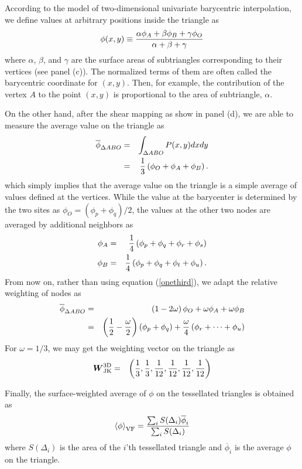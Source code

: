 \documentclass[twocolumn]{aastex63}
\begin{document}
According to the model of two-dimensional univariate barycentric interpolation, we define values at arbitrary positions inside the triangle as
 \begin{equation}
 	\phi(x,y) \equiv {\alpha\phi_A +\beta\phi_B+\gamma\phi_O \over\alpha+\beta+\gamma}
 \end{equation}
 where $\alpha$, $\beta$, and $\gamma$ are the surface areas of subtriangles corresponding to their vertices (see panel (c)). The normalized terms of them are often called the barycentric coordinate for $(x,y)$. Then, for example, the contribution of the vertex $A$ to the point $(x,y)$ is proportional to the area of subtriangle, $\alpha$.
 
 On the other hand, after the shear mapping as show in panel (d), we are able to measure the average value on the triangle as 
 \begin{eqnarray}
 	\overline{\phi}_{\Delta ABO} &=& \int_{\Delta ABO}P(x,y)dxdy \\ \label{onethird}
 	&=& {1\over3}\left( \phi_O +\phi_A + \phi_B\right).
 \end{eqnarray}
which simply implies that the average value on the triangle is a simple average of values defined at the vertices.
While the value at the barycenter is determined by the two sites as $\phi_O = (\phi_p+\phi_q)/2$, the values at the other two nodes are averaged by additional neighbors as
\begin{eqnarray}
	\phi_A &=& {1\over 4}\left(\phi_p +\phi_q + \phi_r + \phi_s \right) \\
	\phi_B &=& {1\over 4}\left(\phi_p +\phi_q + \phi_t + \phi_u \right).
\end{eqnarray}
From now on, rather than using equation (\ref{onethird}), we adapt the relative weighting of nodes as
\begin{eqnarray}
	\overline{\phi}_{\Delta ABO} &=& \left( 1 - {2\omega}\right) \phi_O + {\omega} \phi_A + {\omega} \phi_B \\ \nonumber
	&=& \left( {1\over2} - {\omega\over2}\right) \left( \phi_p + \phi_q\right) + {\omega\over 4}\left( \phi_r +\cdots +\phi_u\right)
\end{eqnarray}
For $\omega=1/3$, we may get the weighting vector on the triangle as
\begin{eqnarray}
	\boldsymbol{W}^\text{3D}_\text{JK} &=& \left({1\over3},{1\over3},{1\over 12}, {1\over 12}, {1\over 12}, {1\over 12}\right)
\end{eqnarray}

Finally, the surface-weighted average of $\phi$ on the tessellated triangles is obtained as
\begin{equation*}
	\left<\phi\right>_\text{VF} = { \sum_i S(\Delta_i)\overline{\phi}_i \over \sum_i S(\Delta_i)}
\end{equation*}
where $S(\Delta_i)$ is the area of the $i$'th tessellated triangle and $\overline{\phi}_i$ is the average $\phi$ on the triangle.
\end{document}
